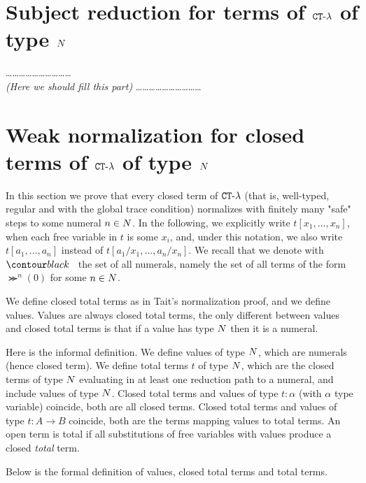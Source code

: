 \documentclass{article}
\begin{document}
\section{Subject reduction for terms of ${ {\tt CT} \mbox{-} \lambda}$ of type ${N}$}
\ldots\ldots\ldots\ldots\ldots\ldots\ldots\ldots\ldots\ldots
\\
\emph{(Here we should fill this part)}
\ldots\ldots\ldots\ldots\ldots\ldots\ldots\ldots\ldots\ldots



\section{Weak normalization for closed terms of ${ {\tt CT} \mbox{-} \lambda}$ of type ${N}$}
\label{section-weak-normalization}
In this section we prove that every closed term of ${ {\tt CT} \mbox{-} \lambda}$
 (that is, well-typed, regular and with the global trace condition) normalizes with finitely many "safe" steps
to some numeral $n \in {N}$.
In the following, we explicitly write $t[x_1,\ldots,x_n]$,
when each free variable in $t$ is some $x_i$, 
and, under this notation, we also write $t[a_1,\ldots,a_n]$ instead of $t[a_1/x_1,\ldots,a_n/x_n]$. 
We recall that we denote with $\Nat$ the set of all numerals, namely the set of all terms of the form
$\Succ^n(0)$ for some $n\in {N}$.

We define closed total terms as in Tait's normalization proof, and we define values.
Values are always closed total terms,
the only different between values and closed total terms 
is that if a value has type ${N}$ then it is a numeral.

Here is the informal definition. We define values of type ${N}$, which are numerals (hence closed term). 
We define total terms $t$ of type ${N}$, which are
the closed terms of type ${N}$ evaluating in at least one reduction path to a numeral, and
include values of type ${N}$. 
Closed total terms and values of type $t:\alpha$ (with $\alpha$ type variable) coincide, 
both are all closed terms.
Closed total terms and values of type $t:A \rightarrow B$ coincide, 
both are the terms mapping values to total terms. 
An open term is total if all substitutions of free variables with values produce a closed \emph{total} term.

Below is the formal definition of values, closed total terms and total terms.
\end{document}
